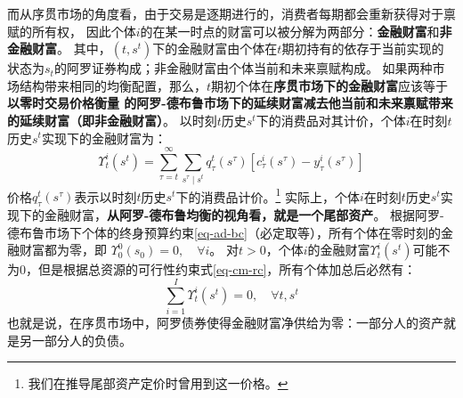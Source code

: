 而从序贯市场的角度看，由于交易是逐期进行的，消费者每期都会重新获得对于禀赋的所有权，
因此个体$i$的在某一时点的财富可以被分解为两部分：\textbf{金融财富}和\textbf{非金融财富}。
其中，$(t,s^t)$下的金融财富由个体在$t$期初持有的依存于当前实现的状态为$s_t$的阿罗证券构成；非金融财富由个体当前和未来禀赋构成。
如果两种市场结构带来相同的均衡配置，那么，$t$期初个体在\textbf{序贯市场下的金融财富}应该等于\textbf{以零时交易价格衡量
的阿罗-德布鲁市场下的延续财富减去他当前和未来禀赋带来的延续财富（即非金融财富）}。
以时刻$t$历史$s^t$下的消费品对其计价，个体$i$在时刻$t$历史$s^t$实现下的金融财富为：
\begin{equation}    \label{eq-ad-fin-wealth-t}
    \Upsilon_t^i\left(s^t\right)=
        \sum_{\tau=t}^{\infty} \sum_{s^\tau \mid s^t} q_\tau^t\left(s^\tau\right)
            \left[c_\tau^i\left(s^\tau\right)-y_\tau^i\left(s^\tau\right)\right]
\end{equation}
价格$q_\tau^t\left(s^\tau\right)$表示以时刻$t$历史$s^t$下的消费品计价。\footnote{我们在推导尾部资产定价时曾用到这一价格。}
实际上，个体$i$在时刻$t$历史$s^t$实现下的金融财富，\textbf{从阿罗-德布鲁均衡的视角看，就是一个尾部资产}。
根据阿罗-德布鲁市场下个体的终身预算约束\ref{eq-ad-bc}（必定取等），所有个体在零时刻的金融财富都为零，即
$\Upsilon_0^0\left(s_0\right)=0, \quad \forall i$。
对$t>0$，个体$i$的金融财富$\Upsilon_t^i\left(s^t\right)$可能不为0，但是根据总资源的可行性约束式\ref{eq-cm-rc}，所有个体加总后必然有：
\begin{equation}
    \sum_{i=1}^I \Upsilon_t^i\left(s^t\right)=0, \quad \forall t, s^t
\end{equation}
也就是说，在序贯市场中，阿罗债券使得金融财富净供给为零：一部分人的资产就是另一部分人的负债。

